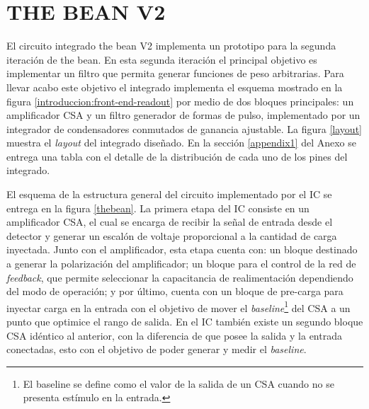 \chapter{THE BEAN V2}
\label{chapter:theoretical}

El circuito integrado the bean V2 implementa un prototipo para la segunda iteración de the bean. En esta segunda iteración el principal objetivo es implementar un filtro que permita generar funciones de peso arbitrarias. 
Para llevar acabo este objetivo el integrado implementa el esquema mostrado en la figura \ref{introduccion:front-end-readout} por medio de dos bloques principales: un amplificador CSA y un filtro generador de formas de pulso, implementado por un integrador de condensadores conmutados de ganancia ajustable. La figura \ref{layout} muestra el \textit{layout} del integrado diseñado. En la sección \ref{appendix1} del Anexo se entrega una tabla con el detalle de la distribución de cada uno de  los pines del integrado.


	
%	

El esquema de la estructura general del circuito implementado por el IC se entrega en la figura \ref{thebean}. La primera etapa del IC consiste en un amplificador CSA, el cual se encarga de recibir la señal de entrada desde el detector y  generar un escalón de voltaje proporcional a la cantidad de carga inyectada. Junto con el amplificador, esta etapa cuenta con: un bloque destinado a generar la polarización del amplificador; un bloque para el control de la red de \textit{feedback}, que permite seleccionar la capacitancia de realimentación dependiendo del modo de operación; y por último, cuenta con un bloque de pre-carga para inyectar carga en la entrada con el objetivo de mover el \textit{baseline}\footnote{El baseline se define como el valor de la salida de un CSA cuando no se presenta estímulo en la entrada.} del CSA a un punto que optimice el rango de salida. En el IC también existe un segundo bloque CSA idéntico al anterior, con la diferencia de que posee la salida y la entrada conectadas, esto con el objetivo de poder generar y medir el \textit{baseline}.
	


%	

